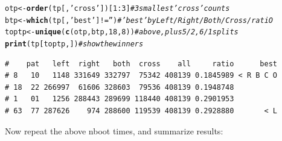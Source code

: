 \documentclass{article}\usepackage[]{graphicx}\usepackage[]{color}
\makeatletter
\newcommand{\hlnum}[1]{\textcolor[rgb]{0.686,0.059,0.569}{#1}}%
\newcommand{\hlstr}[1]{\textcolor[rgb]{0.192,0.494,0.8}{#1}}%
\newcommand{\hlcom}[1]{\textcolor[rgb]{0.678,0.584,0.686}{\textit{#1}}}%
\newcommand{\hlopt}[1]{\textcolor[rgb]{0,0,0}{#1}}%
\newcommand{\hlstd}[1]{\textcolor[rgb]{0.345,0.345,0.345}{#1}}%
\newcommand{\hlkwb}[1]{\textcolor[rgb]{0.69,0.353,0.396}{#1}}%
\newcommand{\hlkwd}[1]{\textcolor[rgb]{0.737,0.353,0.396}{\textbf{#1}}}%
\newenvironment{kframe}{%
 \def\at@end@of@kframe{}%
 \ifinner\ifhmode%
  \def\at@end@of@kframe{\end{minipage}}%
  \begin{minipage}{\columnwidth}%
 \fi\fi%
 \def\FrameCommand##1{\hskip\@totalleftmargin \hskip-\fboxsep
 \colorbox{shadecolor}{##1}\hskip-\fboxsep
     \hskip-\linewidth \hskip-\@totalleftmargin \hskip\columnwidth}%
 \MakeFramed {\advance\hsize-\width
   \@totalleftmargin\z@ \linewidth\hsize
   \@setminipage}}%
 {\par\unskip\endMakeFramed%
 \at@end@of@kframe}
\newenvironment{knitrout}{}{} %
\makeatother
\begin{document}
\begin{knitrout}\footnotesize
{}\color{fgcolor}\begin{kframe}
\begin{alltt}
\hlstd{otp} \hlkwb{<-} \hlkwd{order}\hlstd{(tp[,}\hlstr{'cross'}\hlstd{])[}\hlnum{1}\hlopt{:}\hlnum{3}\hlstd{]}    \hlcom{# 3 smallest 'cross' counts}
\hlstd{btp} \hlkwb{<-} \hlkwd{which}\hlstd{(tp[,}\hlstr{'best'}\hlstd{]} \hlopt{!=} \hlstr{''}\hlstd{)}    \hlcom{# 'best' by Left/Right/Both/Cross/ratiO}
\hlstd{toptp} \hlkwb{<-} \hlkwd{unique}\hlstd{(}\hlkwd{c}\hlstd{(otp,btp,}\hlnum{18}\hlstd{,}\hlnum{8}\hlstd{))}   \hlcom{# above, plus 5/2, 6/1 splits}
\hlkwd{print}\hlstd{(tp[toptp,])}                  \hlcom{# show the winners}
\end{alltt}
\begin{verbatim}
#    pat   left  right   both  cross    all     ratio      best
# 8   10   1148 331649 332797  75342 408139 0.1845989 < R B C O
# 18  22 266997  61606 328603  79536 408139 0.1948748          
# 1   01   1256 288443 289699 118440 408139 0.2901953          
# 63  77 287626    974 288600 119539 408139 0.2928880       < L
\end{verbatim}
\end{kframe}
\end{knitrout}

Now repeat the above nboot times, and summarize results:
\end{document}
